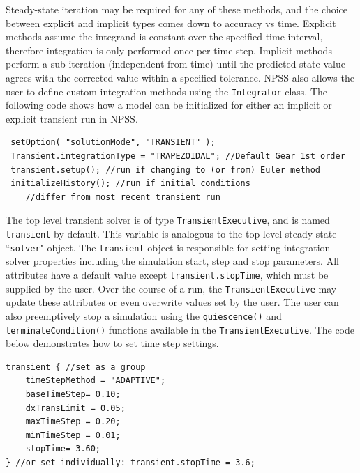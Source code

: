 \documentclass[heading.tex]{subfiles}
\begin{document}
\vspace{5mm} %

Steady-state iteration may be required for any of these methods, and the choice between explicit
and implicit types comes down to accuracy vs time. Explicit methods assume the integrand is
constant over the specified time interval, therefore integration is only performed once per time
step. Implicit methods perform a sub-iteration (independent from time) until the predicted state
value agrees with the corrected value within a specified tolerance. NPSS also allows the user to
define custom integration methods using the \texttt{Integrator} class. \cite[chap.~15.2]{NPSS}
The following code shows how a model can be initialized for either an
implicit or explicit transient run in NPSS.

\begin{adjustwidth}{-0.5cm}{-0.5cm}
 \begin{verbatim}
 setOption( "solutionMode", "TRANSIENT" );
 Transient.integrationType = "TRAPEZOIDAL"; //Default Gear 1st order
 transient.setup(); //run if changing to (or from) Euler method
 initializeHistory(); //run if initial conditions 
 	//differ from most recent transient run
 \end{verbatim}
 \end{adjustwidth} 
       

The top level transient solver is of type \texttt{TransientExecutive}, and is named
\texttt{transient} by default. This variable is analogous to the top-level steady-state 
``\texttt{solver}" object. The \texttt{transient} object is responsible for setting integration
solver properties including the simulation start, step and stop parameters. \cite[chap.~7.5]{NPSS}
\cite[chap.~15.1.8]{NPSS}  All attributes have a default value except \texttt{transient.stopTime},
which must be supplied by the user. Over the course of a run, the \texttt{TransientExecutive} may
update these attributes or even overwrite values set by the user. The user can also preemptively
stop a simulation using the  \texttt{quiescence()} and  \texttt{terminateCondition()} functions
available in the \texttt{TransientExecutive}. The code below demonstrates how
to set time step settings.

\begin{adjustwidth}{0cm}{0cm}
 \begin{verbatim}
transient { //set as a group
	timeStepMethod = "ADAPTIVE";
	baseTimeStep= 0.10;
	dxTransLimit = 0.05;
	maxTimeStep = 0.20;
	minTimeStep = 0.01;
	stopTime= 3.60;
} //or set individually: transient.stopTime = 3.6;
 \end{verbatim}
 \end{adjustwidth} 
\end{document}
